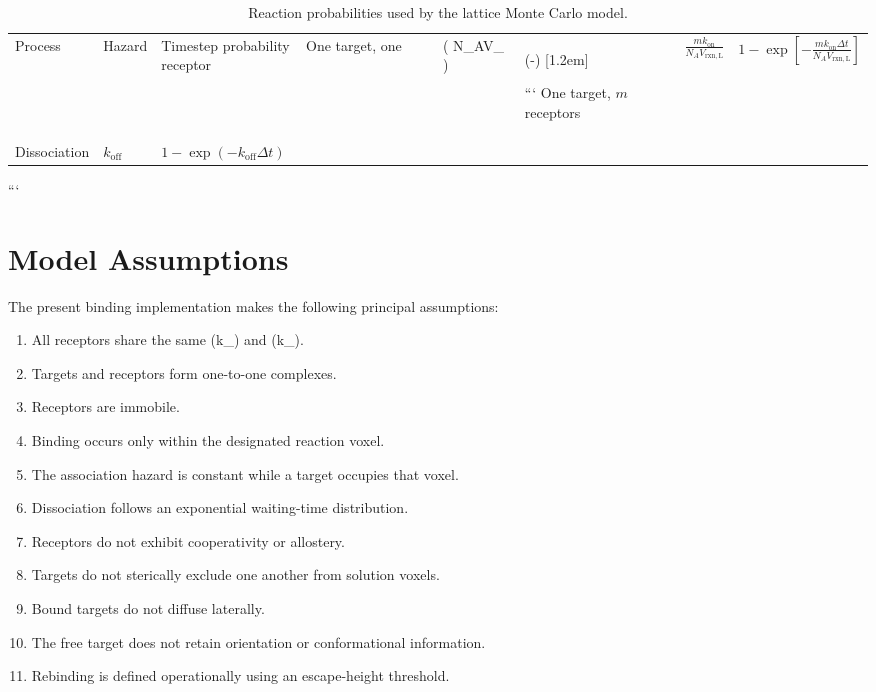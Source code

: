 \documentclass[11pt]{article}
\begin{document}
\begin{table}[ht]
\centering
\caption{Reaction probabilities used by the lattice Monte Carlo model.}
\label{tab:probabilities}
\begin{tabular}{lll}
\toprule
Process & Hazard & Timestep probability \
\midrule
One target, one receptor
&
(\displaystyle
{}
{N_AV_{}}
)
&
(-\exp{}
)
[1.2em]

```
    One target, \(m\) receptors
    &
    \(\displaystyle
    \frac{mk_{\mathrm{on}}}
    {N_AV_{\mathrm{rxn,L}}}
    \)
    &
    \(\displaystyle
    1-\exp\left[
    -\frac{mk_{\mathrm{on}}\Delta t}
    {N_AV_{\mathrm{rxn,L}}}
    \right]
    \)
    \\[1.2em]

    Dissociation
    &
    \(k_{\mathrm{off}}\)
    &
    \(\displaystyle
    1-\exp(-k_{\mathrm{off}}\Delta t)
    \)
    \\
    \bottomrule
\end{tabular}
```

\end{table}

\section{Model Assumptions}

The present binding implementation makes the following principal assumptions:

\begin{enumerate}
\item All receptors share the same (k_{}) and (k_{}).
\item Targets and receptors form one-to-one complexes.
\item Receptors are immobile.
\item Binding occurs only within the designated reaction voxel.
\item The association hazard is constant while a target occupies that voxel.
\item Dissociation follows an exponential waiting-time distribution.
\item Receptors do not exhibit cooperativity or allostery.
\item Targets do not sterically exclude one another from solution voxels.
\item Bound targets do not diffuse laterally.
\item The free target does not retain orientation or conformational information.
\item Rebinding is defined operationally using an escape-height threshold.
\end{enumerate}
\end{document}
